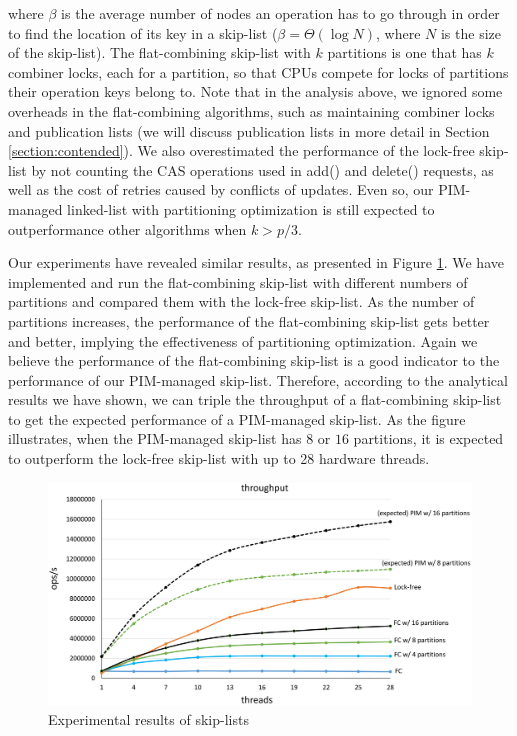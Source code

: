 where $\beta$ is the average number of nodes an operation has to go through
in order to find the location of its key in a skip-list
($\beta = \Theta(\log N)$, where $N$ is the size of the skip-list).
The flat-combining skip-list with $k$ partitions is one that has $k$ combiner locks,
each for a partition, so that CPUs compete for locks of partitions their operation
keys belong to.
Note that in the analysis above, we ignored some overheads in the flat-combining
algorithms, such as maintaining combiner locks and publication lists
(we will discuss publication lists in more detail in Section \ref{section:contended}).
We also overestimated the performance of the lock-free skip-list by not counting the
CAS operations used in add() and delete() requests, as well as the cost of retries
caused by conflicts of updates.
Even so, our PIM-managed linked-list with partitioning optimization is
still expected to outperformance other algorithms when $k > p/3$.

Our experiments have revealed similar results, 
as presented in Figure \ref{figure:skiplist_data}.
We have implemented and run the flat-combining skip-list with different numbers of
partitions and compared them with the lock-free skip-list.
As the number of partitions increases, the performance of the flat-combining skip-list
gets better and better, implying the effectiveness of partitioning optimization.
Again we believe the performance of the flat-combining skip-list is a good indicator
to the performance of our PIM-managed skip-list.
Therefore, according to the analytical results we have shown, we can triple the throughput
of a flat-combining skip-list to get the expected performance of a PIM-managed skip-list.
As the figure illustrates, when the PIM-managed skip-list has $8$ or $16$ partitions,
it is expected to outperform the lock-free skip-list with up to 28 hardware threads.

\begin{figure}[ht!]
\centering
\includegraphics[width=.8\linewidth]{skiplist_data.eps}
\caption{Experimental results of skip-lists}
\label{figure:skiplist_data}
\end{figure}

